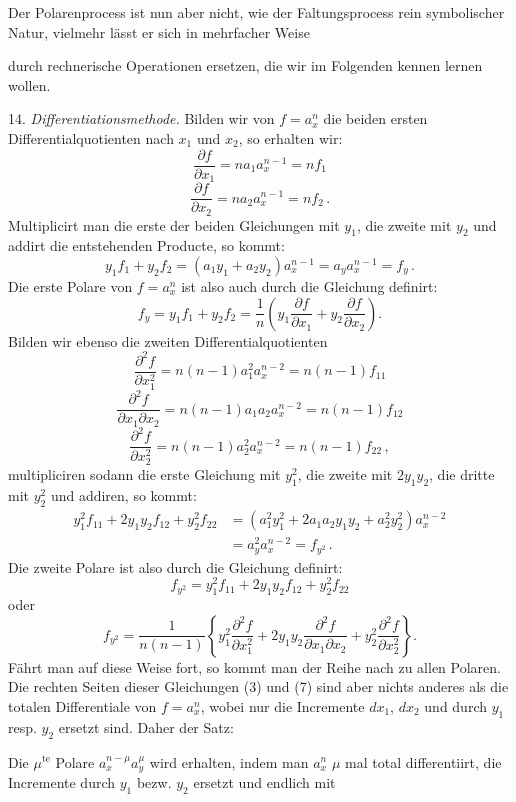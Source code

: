 \documentclass[11pt]{article}
\providecommand{\weberpage}[1]{}
\providecommand{\weq}[2]{\begin{equation}\tag{#1}#2\end{equation}}
\begin{document}
Der Polarenprocess ist nun aber nicht, wie der Faltungsprocess rein symbolischer Natur, vielmehr lässt er sich in mehrfacher Weise


\weberpage{18}

durch rechnerische Operationen ersetzen, die wir im Folgenden kennen lernen wollen.

14. \textit{Differentiationsmethode.} Bilden wir von $f=a_x^n$ die beiden ersten Differentialquotienten nach $x_1$ und $x_2$, so erhalten wir:
\weq{1}{\frac{\partial f}{\partial x_1} = na_1a_x^{n-1} = nf_1}
\weq{2}{\frac{\partial f}{\partial x_2} = na_2a_x^{n-1} = nf_2\,.}
Multiplicirt man die erste der beiden Gleichungen mit $y_1$, die zweite mit $y_2$ und addirt die entstehenden Producte, so kommt:
\[ y_1f_1+y_2f_2 = (a_1y_1+a_2y_2)a_x^{n-1} = a_ya_x^{n-1} = f_y\,. \]
Die erste Polare von $f=a_x^n$ ist also auch durch die Gleichung definirt:
\weq{3}{f_y = y_1f_1+y_2f_2 = \frac{1}{n}\left(y_1\frac{\partial f}{\partial x_1}+y_2\frac{\partial f}{\partial x_2}\right).}
Bilden wir ebenso die zweiten Differentialquotienten
\weq{4}{\frac{\partial^2 f}{\partial x_1^2} = n(n-1)a_1^2a_x^{n-2} = n(n-1)f_{11}}
\weq{5}{\frac{\partial^2 f}{\partial x_1\partial x_2} = n(n-1)a_1a_2a_x^{n-2} = n(n-1)f_{12}}
\weq{6}{\frac{\partial^2 f}{\partial x_2^2} = n(n-1)a_2^2a_x^{n-2} = n(n-1)f_{22}\,,}
multipliciren sodann die erste Gleichung mit $y_1^2$, die zweite mit $2y_1y_2$, die dritte mit $y_2^2$ und addiren, so kommt:
\[
\begin{aligned}
y_1^2f_{11}+2y_1y_2f_{12}+y_2^2f_{22} &= (a_1^2y_1^2+2a_1a_2y_1y_2+a_2^2y_2^2)a_x^{n-2}\\
&= a_y^2a_x^{n-2} = f_{y^2}\,.
\end{aligned}
\]
Die zweite Polare ist also durch die Gleichung definirt:
\[ f_{y^2} = y_1^2f_{11}+2y_1y_2f_{12}+y_2^2f_{22} \]
oder
\weq{7}{f_{y^2} = \frac{1}{n(n-1)}\left\{y_1^2\frac{\partial^2 f}{\partial x_1^2}+2y_1y_2\frac{\partial^2 f}{\partial x_1\partial x_2}+y_2^2\frac{\partial^2 f}{\partial x_2^2}\right\}.}
Fährt man auf diese Weise fort, so kommt man der Reihe nach zu allen Polaren. Die rechten Seiten dieser Gleichungen (3) und (7) sind aber nichts anderes als die totalen Differentiale von $f=a_x^n$, wobei nur die Incremente $dx_1$, $dx_2$ und durch $y_1$ resp. $y_2$ ersetzt sind. Daher der Satz:

\glqq Die $\mu^{\text{te}}$ Polare $a_x^{n-\mu}a_y^\mu$ wird erhalten, indem man $a_x^n$ $\mu$ mal total differentiirt, die Incremente durch $y_1$ bezw. $y_2$ ersetzt und endlich mit
\end{document}
